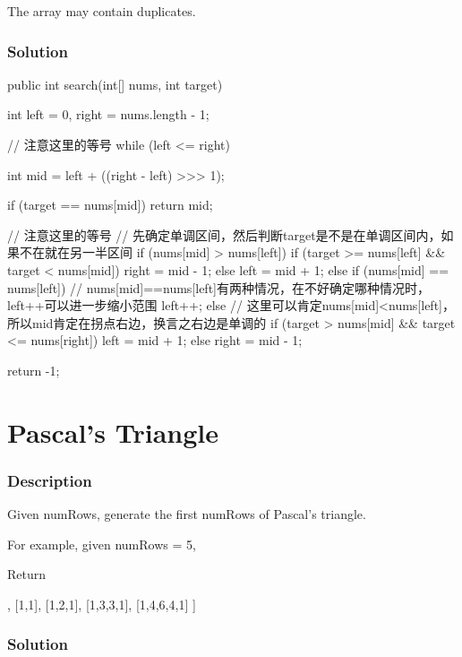 The array may contain duplicates.

\subsubsection{Solution}

\begin{Code}
public int search(int[] nums, int target) {
    int left = 0, right = nums.length - 1;

    // 注意这里的等号
    while (left <= right) {
        int mid = left + ((right - left) >>> 1);

        if (target == nums[mid]) {
            return mid;
        }

        // 注意这里的等号
        // 先确定单调区间，然后判断target是不是在单调区间内，如果不在就在另一半区间
        if (nums[mid] > nums[left]) {
            if (target >= nums[left] && target < nums[mid]) {
                right = mid - 1;
            } else {
                left = mid + 1;
            }
        } else if (nums[mid] == nums[left]) {
            // nums[mid]==nums[left]有两种情况，在不好确定哪种情况时，left++可以进一步缩小范围
            left++;
        } else {
            // 这里可以肯定nums[mid]<nums[left]，所以mid肯定在拐点右边，换言之右边是单调的
            if (target > nums[mid] && target <= nums[right]) {
                left = mid + 1;
            } else {
                right = mid - 1;
            }
        }
    }

    return -1;
}
\end{Code}

\newpage

\section{Pascal's Triangle} %

\subsubsection{Description}
Given numRows, generate the first numRows of Pascal's triangle.

For example, given numRows = 5,

Return
\begin{Code}
[
     [1],
    [1,1],
   [1,2,1],
  [1,3,3,1],
 [1,4,6,4,1]
]
\end{Code}
\subsubsection{Solution}

